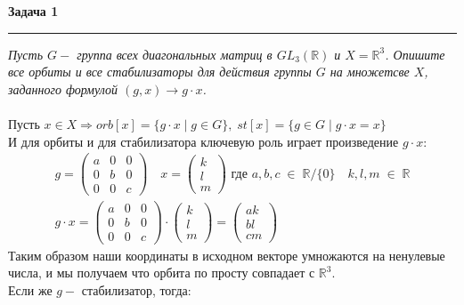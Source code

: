 \documentclass[a4paper,11pt]{article}
\begin{document}
\textbf{\large Задача 1}
\medskip\hrule\medskip
\textit{Пусть $ G - $ группа всех диагональных матриц в $ GL_3(\mathbb{R}) $ и $ X = \mathbb{R}^3 $. Опишите все орбиты и все стабилизаторы для действия группы $ G $ на множетсве $ X $, заданного формулой $ (g, x) \to g \cdot x $. } \\ \\
Пусть $ x \in X \Rightarrow orb[x] = \{g \cdot x \; | \; g \in G \}, \; st[x] = \{g \in G \; | \; g \cdot x = x \} $  \\
И для орбиты и для стабилизатора ключевую роль играет произведение $ g \cdot x $:
\begin{gather*}
g = 
\begin{pmatrix}
a & 0 & 0 \\[2pt]
0 & b & 0 \\[2pt]
0 & 0 & c
\end{pmatrix}
\quad x = 
\begin{pmatrix}
k \\[2pt] 
l \\[2pt]
m
\end{pmatrix}
\text{ где } a, b, c \; \in \; \mathbb{R} / \{0\} \quad k, l, m \; \in \; \mathbb{R}  \\[2pt]
g \cdot x = 
\begin{pmatrix}
a & 0 & 0 \\[2pt]
0 & b & 0 \\[2pt]
0 & 0 & c
\end{pmatrix}
\cdot 
\begin{pmatrix}
k \\[2pt] 
l \\[2pt]
m
\end{pmatrix} 
= 
\begin{pmatrix}
ak \\[2pt] 
bl \\[2pt]
cm
\end{pmatrix} 
\end{gather*}
Таким образом наши координаты в исходном векторе умножаются на ненулевые числа, и мы получаем что орбита по просту совпадает с $ \mathbb{R}^3 $. \\[2pt]
Если же $ g - $ стабилизатор, тогда:
\end{document}
